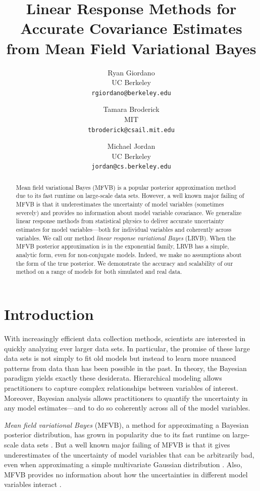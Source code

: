 \documentclass{article}\usepackage[]{graphicx}\usepackage[]{color}
\title{Linear Response Methods for Accurate Covariance Estimates from
       Mean Field Variational Bayes}
\author{
Ryan Giordano\\
UC Berkeley\\
\texttt{rgiordano@berkeley.edu}
\and
Tamara Broderick \\
MIT\\
\texttt{tbroderick@csail.mit.edu}
\and
Michael Jordan \\
UC Berkeley\\
\texttt{jordan@cs.berkeley.edu}
}
\theoremstyle{plain}
\begin{document}
\maketitle

\begin{abstract}

Mean field variational Bayes (MFVB) is a popular posterior approximation method
due to its fast runtime on large-scale data sets. However, a well known major
failing of MFVB is that it underestimates the uncertainty of model variables
(sometimes severely) and provides no information about model variable
covariance.
%
We generalize linear response methods from statistical physics
to deliver accurate uncertainty estimates for model
variables---both for individual variables and coherently across variables.
We call our method \emph{linear response variational Bayes} (LRVB).
When the MFVB posterior approximation is in the exponential family,
LRVB has a simple, analytic form, even for
non-conjugate models. Indeed, we make no assumptions about the form of the
true posterior.
%
We demonstrate the accuracy and scalability of
our method on a range of models for both simulated and real data.

\end{abstract}




\section{Introduction}\label{sec:intro}

With increasingly efficient data collection methods, scientists are interested
in quickly analyzing ever larger data sets. In particular, the promise of these
large data sets is not simply to fit old models but instead to learn more
nuanced patterns from data than has been possible in the past. In theory, the
Bayesian paradigm yields exactly these desiderata. Hierarchical modeling allows
practitioners to capture complex relationships between variables of interest.
Moreover, Bayesian analysis allows practitioners to quantify the uncertainty in
any model estimates---and to do so coherently across all of the model variables.

\emph{Mean field variational Bayes} (MFVB), a method for approximating
a Bayesian posterior distribution, has grown in
popularity due to its fast runtime on large-scale data sets
\citep{blei:2003:lda, blei:2006:dp, hoffman:2013:stochastic}.
But a well known major failing of MFVB is that it gives
underestimates of the uncertainty of model variables that can be arbitrarily
bad, even when approximating a simple multivariate Gaussian distribution
\citep{mackay:2003:information,bishop:2006:pattern,turner:2011:two}.
Also, MFVB provides no information about how
the uncertainties in different model variables interact
\citep{wang:2005:inadequacy, bishop:2006:pattern, rue:2009:approximate, turner:2011:two}.
\end{document}

